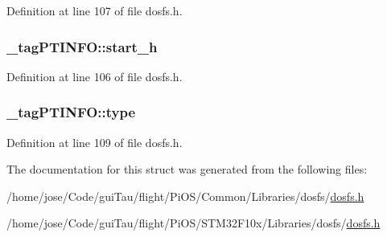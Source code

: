 Definition at line 107 of file dosfs.\-h.

\hypertarget{struct__tag_p_t_i_n_f_o_adf2c85cde53029d5a6faecdeadce631a}{
\subsubsection[{start\-\_\-h}]{ \-\_\-tag\-P\-T\-I\-N\-F\-O\-::start\-\_\-h}}\label{struct__tag_p_t_i_n_f_o_adf2c85cde53029d5a6faecdeadce631a}


Definition at line 106 of file dosfs.\-h.

\hypertarget{struct__tag_p_t_i_n_f_o_a1b91dc4e2e5424cefd0042e51eeb42e0}{
\subsubsection[{type}]{ \-\_\-tag\-P\-T\-I\-N\-F\-O\-::type}}\label{struct__tag_p_t_i_n_f_o_a1b91dc4e2e5424cefd0042e51eeb42e0}


Definition at line 109 of file dosfs.\-h.



The documentation for this struct was generated from the following files\-:\begin{DoxyCompactItemize}
\item 
/home/jose/\-Code/gui\-Tau/flight/\-Pi\-O\-S/\-Common/\-Libraries/dosfs/\hyperlink{_common_2_libraries_2dosfs_2dosfs_8h}{dosfs.\-h}\item 
/home/jose/\-Code/gui\-Tau/flight/\-Pi\-O\-S/\-S\-T\-M32\-F10x/\-Libraries/dosfs/\hyperlink{_s_t_m32_f10x_2_libraries_2dosfs_2dosfs_8h}{dosfs.\-h}\end{DoxyCompactItemize}
